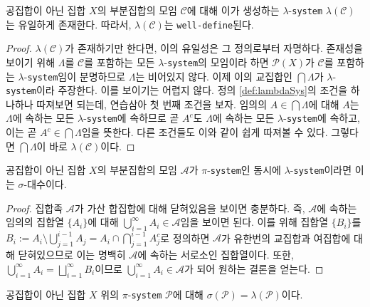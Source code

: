 \begin{proposition}
    공집합이 아닌 집합 $X$의 부분집합의 모임 $\mathcal{C}$에 대해 이가 생성하는 $\lambda$-\texttt{system} $\lambda(\mathcal{C})$는 유일하게 존재한다. 따라서, $\lambda(\mathcal{C})$는 \texttt{well-define}된다.
\end{proposition}

\begin{proof}
    $\lambda(\mathcal{C})$가 존재하기만 한다면, 이의 유일성은 그 정의로부터 자명하다. 존재성을 보이기 위해 $\Lambda$를 $\mathcal{C}$를 포함하는 모든 $\lambda$-\texttt{system}의 모임이라 하면 $\mathcal{P}(X)$가 $\mathcal{C}$를 포함하는 $\lambda$-\texttt{system}임이 분명하므로 $\Lambda$는 비어있지 않다. 이제 이의 교집합인 $\bigcap\Lambda$가 $\lambda$-\texttt{system}이라 주장한다. 이를 보이기는 어렵지 않다. 정의 \ref{def:lambdaSys}의 조건을 하나하나 따져보면 되는데, 연습삼아 첫 번째 조건을 보자. 임의의 $A\in\bigcap\Lambda$에 대해 $A$는 $\Lambda$에 속하는 모든 $\lambda$-\texttt{system}에 속하므로 곧 $A^c$도 $\Lambda$에 속하는 모든 $\lambda$-\texttt{system}에 속하고, 이는 곧 $A^c\in\bigcap\Lambda$임을 뜻한다. 다른 조건들도 이와 같이 쉽게 따져볼 수 있다. 그렇다면 $\bigcap\Lambda$이 바로 $\lambda(\mathcal{C})$이다.
\end{proof}

\begin{lemma}\label{lem:Dynkin}
    공집합이 아닌 집합 $X$의 부분집합의 모임 $\mathcal{A}$가 $\pi$-\texttt{system}인 동시에 $\lambda$-\texttt{system}이라면 이는 $\sigma$-대수이다.
\end{lemma}

\begin{proof}
    집합족 $\mathcal{A}$가 가산 합집합에 대해 닫혀있음을 보이면 충분하다. 즉, $\mathcal{A}$에 속하는 임의의 집합열 $\{A_i\}$에 대해 $\bigcup_{i=1}^\infty A_i\in\mathcal{A}$임을 보이면 된다. 이를 위해 집합열 $\{B_i\}$를 $B_i:=A_i\setminus\bigcup_{j=1}^{i-1}A_j=A_i\cap\bigcap_{j=1}^{i-1}A_j^c$로 정의하면 $\mathcal{A}$가 유한번의 교집합과 여집합에 대해 닫혀있으므로 이는 명백히 $\mathcal{A}$에 속하는 서로소인 집합열이다. 또한, $\bigcup_{i=1}^\infty A_i=\bigsqcup_{i=1}^\infty B_i$이므로 $\bigcup_{i=1}^\infty A_i\in\mathcal{A}$가 되어 원하는 결론을 얻는다.
\end{proof}

\begin{theorem}
    공집합이 아닌 집합 $X$ 위의 $\pi$-\texttt{system} $\mathcal{P}$에 대해 $\sigma(\mathcal{P})=\lambda(\mathcal{P})$이다.
\end{theorem}


